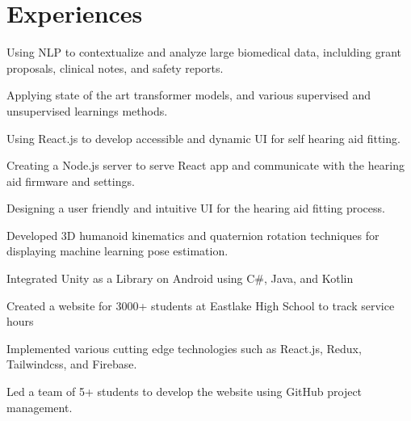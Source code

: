 \documentclass[]{main}
\begin{document}
\begin{minipage}[t]{0.66\textwidth} 

\vspace{5pt}
\section{Experiences}

\vspace{10pt}
\begin{tightemize}
    \item Using NLP to contextualize and analyze large biomedical data, inclulding grant proposals, clinical notes, and safety reports.
    \item Applying state of the art transformer models, and various supervised and unsupervised learnings methods.
\end{tightemize}
\sectionsep

\begin{tightemize}
    \item Using React.js to develop accessible and dynamic UI for self hearing aid fitting.
    \item Creating a Node.js server to serve React app and communicate with the hearing aid firmware and settings.
    \item Designing a user friendly and intuitive UI for the hearing aid fitting process.
\end{tightemize}
\sectionsep

\begin{tightemize}
    \item Developed 3D humanoid kinematics and quaternion rotation techniques
for displaying machine learning pose estimation.
    \item Integrated Unity as a Library on Android using C\#, Java, and Kotlin
\end{tightemize}
\sectionsep

\begin{tightemize}
    \item Created a website for 3000+ students at Eastlake High School to track service hours
    \item Implemented various cutting edge technologies such as React.js, Redux, Tailwindcss, and Firebase.
    \item Led a team of 5+ students to develop the website using GitHub project management.
\end{tightemize}
\sectionsep


\end{minipage}
\end{document}
